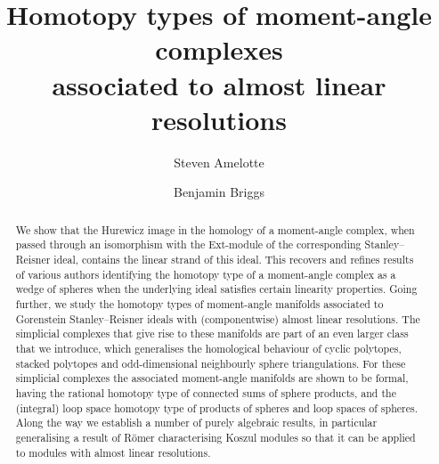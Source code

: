 \documentclass[a4paper,10pt]{amsart}
\theoremstyle{definition}
\theoremstyle{remark}
\begin{document}
\title[Homotopy types associated to almost linear resolutions]{Homotopy types of moment-angle complexes\\ associated to almost linear resolutions} 

\date{}

\author[S.~Amelotte]{Steven Amelotte}
\address{School of Mathematics and Statistics, 4302 Herzberg Laboratories, Carleton University, Ottawa, ON, K1S 5B6, Canada}

\author[B.~Briggs]{Benjamin Briggs}
\address{Department of Mathematics, Huxley Building, South Kensington Campus, Imperial College London, 
London, SW7 2AZ, U.K.}



\begin{abstract}
We show that the Hurewicz image in the homology of a moment-angle complex, when passed through an isomorphism with the Ext-module of the corresponding Stanley--Reisner ideal, contains the linear strand of this ideal. 
This recovers and refines results of various authors identifying the homotopy type of a moment-angle complex as a wedge of spheres when the underlying ideal satisfies certain linearity properties. Going further, we study the homotopy types of moment-angle manifolds associated to Gorenstein Stanley--Reisner ideals with (componentwise) almost linear resolutions. The simplicial complexes that give rise to these manifolds are part of an even larger class that we introduce, which generalises the homological behaviour of cyclic polytopes, stacked polytopes and odd-dimensional neighbourly sphere triangulations. For these simplicial complexes the associated moment-angle manifolds are shown to be formal, having the rational homotopy type of connected sums of sphere products, and the (integral) loop space homotopy type of products of spheres and loop spaces of spheres. Along the way we establish a number of purely algebraic results, in particular generalising a result of R\"omer characterising Koszul modules so that it can be applied to modules with almost linear resolutions.
\end{abstract}

\maketitle
\end{document}
